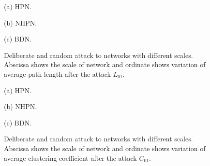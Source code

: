 \documentclass[final]{IEEEtran}
\begin{document}




\begin{figure}[t!]
\centering
\begin{minipage}[b]{0.3\linewidth}
\centering
\parbox{15.5cm}{\footnotesize \hspace{2.5cm}(a) HPN.}
\end{minipage}
\begin{minipage}[b]{0.3\linewidth}
    \centering
 \parbox{15.5cm}{\footnotesize \hspace{2.3cm}(b) NHPN.}
\end{minipage}
\begin{minipage}[b]{0.3\linewidth}
    \centering
 \parbox{15.5cm}{\footnotesize \hspace{2.5cm}(c) BDN.}
\end{minipage}
\hspace{3ex}
 \caption{\label{f10} Deliberate and random attack to networks with different scales. Abscissa shows the scale of network and ordinate shows variation of average path length after the attack $L_{01}$.}
\end{figure}
\begin{figure}
\centering
\begin{minipage}{0.3\linewidth}
\centering
\parbox{15.5cm}{\footnotesize \hspace{2.5cm}(a) HPN.}
\end{minipage}
\begin{minipage}{0.3\linewidth}
    \centering
 \parbox{15.5cm}{\footnotesize \hspace{2.3cm}(b) NHPN.}
\end{minipage}
\begin{minipage}{0.3\linewidth}
    \centering
 \parbox{15.5cm}{\footnotesize \hspace{2.5cm}(c) BDN.}
\end{minipage}
\hspace{3ex}
 \caption{\label{f11} Deliberate and random attack to networks with different scales. Abscissa shows the scale of network and ordinate shows variation of average clustering  coefficient after the attack $C_{01}$.}
\end{figure}
\end{document}
